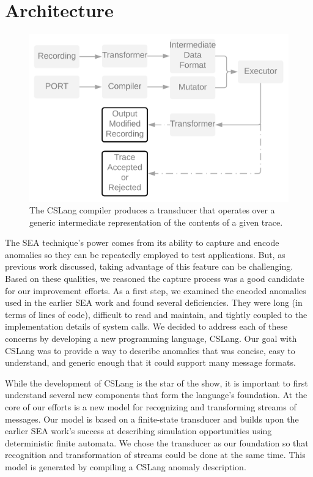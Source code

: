 \section{Architecture}
\label{SEC:architecture}

\begin{figure}
  \includegraphics[scale=.08, frame]{images/architecture}
  \caption{The CSLang compiler produces a transducer that operates over a
  generic intermediate representation of the contents of a given trace.}
  \label{fig:architecture}
\end{figure}


The SEA technique's power comes from its ability to capture and encode
anomalies so they can be repeatedly employed to test applications.  But, as
previous work discussed, taking advantage of this feature can be
challenging.  Based on these qualities, we reasoned the capture process
was a good candidate for our improvement efforts.
As a first step, we examined the encoded anomalies used in the
earlier SEA work and found several deficiencies.
They were
long (in terms of lines of code),
difficult to read and maintain,
and tightly coupled to the implementation details of system calls.
We decided to address each of these concerns by developing a new
programming language, CSLang.  Our goal with CSLang was to provide a way to
describe anomalies that was concise, easy to understand, and generic enough
that it could support many message formats.

While the development of CSLang
is the star of the show,
it is important to first understand
several new components
that form the language's foundation.
At the core of our efforts is
a new model for recognizing and transforming streams of messages.  Our
model is based on a finite-state transducer and builds upon the earlier SEA
work's success at describing simulation opportunities using deterministic
finite automata.  We chose the transducer as our foundation so that
recognition and transformation of streams could be done at the same time.
This model is generated by compiling a CSLang anomaly description.

